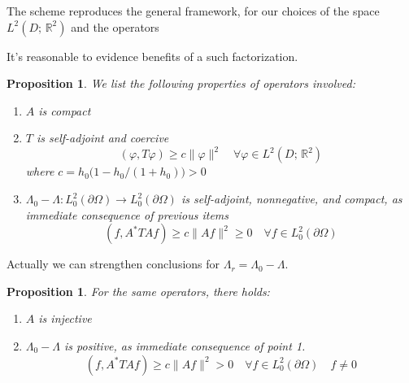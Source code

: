 \documentclass[10pt, a4paper, twoside, openright]{book}
\theoremstyle{definition}
\theoremstyle{plain}
\theoremstyle{plain}
\theoremstyle{plain}
\newtheorem{proposition}[subsection]{Proposition}
\theoremstyle{plain}
\theoremstyle{plain}
\theoremstyle{plain}
\theoremstyle{plain}
\theoremstyle{plain}
\let\phi\varphi
\begin{document}
The scheme reproduces the general framework, for our choices of the space $L^2(D;\,\mathbb{R}^2)$ and the operators 
\begin{center}
\end{center}
It's reasonable to evidence benefits of a such factorization.
\begin{proposition}
 We list the following properties of operators involved:
 \begin{enumerate}
  \item $A$ is compact
  \item $T$ is self-adjoint and coercive
  \begin{equation}
   (\phi,T\phi)\geq c\|\phi\|^2\quad \forall \phi \in L^2(D;\,\mathbb{R}^2)
  \end{equation}
  where $c = h_0\Big(1-h_0/(1+h_0)\Big)>0$
  \item $\Lambda_0 - \Lambda: L^2_0(\partial \Omega) \to L^2_0(\partial \Omega)$ is self-adjoint, nonnegative, and compact, as immediate consequence of previous items
  \begin{equation}
   (f,A^*TAf)\geq c\|Af\|^2\geq 0\quad \forall f \in L^2_0(\partial \Omega)
  \end{equation}  
 \end{enumerate}
\end{proposition}
Actually we can strengthen conclusions for $\Lambda_r = \Lambda_0 - \Lambda$.
\begin{proposition}
For the same operators, there holds:
\begin{enumerate}
 \item $A$ is injective
 \item $\Lambda_0 -\Lambda$ is positive, as immediate consequence of point 1.
  \begin{equation}
   (f,A^*TAf)\geq c\|Af\|^2 > 0\quad \forall f \in L^2_0(\partial \Omega)\quad f\neq 0
  \end{equation}
\end{enumerate}
\end{proposition}
\end{document}
